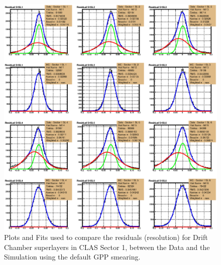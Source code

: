 \begin{figure}[htpb]\begin{center}
\includegraphics[width=\columnwidth]{figures/calib/dc/Sector_1_compare_default.eps}
\caption[DC superlayers Resolution Matching]{\label{fig:SLRes_default}Plots and Fits used to compare the residuals (resolution) for Drift Chamber superlayers in CLAS Sector 1, between the Data and the Simulation using the default GPP smearing.}
\end{center}\end{figure}

